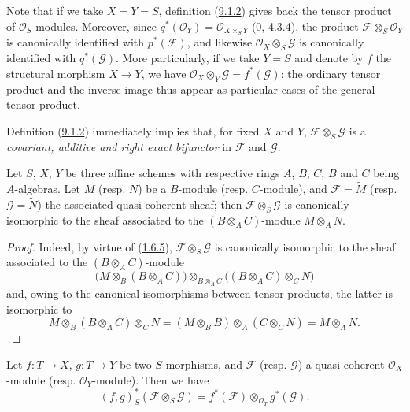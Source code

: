 Note that if we take $X=Y=S$, definition
(\hyperref[I.9.1.2]{9.1.2}) gives back the tensor product of
$\mathscr{O}_S$-modules. Moreover, since
$q^*(\mathscr{O}_Y)=\mathscr{O}_{X\times_S Y}$
(\hyperref[0.4.3.4]{0, 4.3.4}), the product
$\mathscr{F}\otimes_S\mathscr{O}_Y$ is canonically identified with
$p^*(\mathscr{F})$, and likewise
$\mathscr{O}_X\otimes_S\mathscr{G}$ is canonically identified with
$q^*(\mathscr{G})$. More particularly, if we take $Y=S$ and denote by $f$
the structural morphism $X\to Y$, we have
$\mathscr{O}_X\otimes_Y\mathscr{G}=f^*(\mathscr{G})$: the ordinary tensor
product and the inverse image thus appear as particular cases of the
general tensor product.

Definition (\hyperref[I.9.1.2]{9.1.2}) immediately implies that, for
fixed $X$ and $Y$, $\mathscr{F}\otimes_S\mathscr{G}$ is a
\emph{covariant, additive and right exact bifunctor} in $\mathscr{F}$ and
$\mathscr{G}$.

\begin{proposition}[9.1.3]
\label{I.9.1.3}
Let $S$, $X$, $Y$ be three affine schemes with respective rings $A$, $B$,
$C$, $B$ and $C$ being $A$-algebras. Let $M$ (resp. $N$) be a $B$-module
(resp. $C$-module), and $\mathscr{F}=\widetilde{M}$ (resp.
$\mathscr{G}=\widetilde{N}$) the associated quasi-coherent sheaf; then
$\mathscr{F}\otimes_S\mathscr{G}$ is canonically isomorphic to the sheaf
associated to the $(B\otimes_A C)$-module $M\otimes_A N$.
\end{proposition}

\begin{proof}
Indeed, by virtue of (\hyperref[I.1.6.5]{1.6.5}),
$\mathscr{F}\otimes_S\mathscr{G}$ is canonically isomorphic to the sheaf
associated to the $(B\otimes_A C)$-module
\[
  \bigl(M\otimes_B(B\otimes_A C)\bigr)
  \otimes_{B\otimes_A C}
  \bigl((B\otimes_A C)\otimes_C N\bigr)
\]
and, owing to the canonical isomorphisms between tensor products, the
latter is isomorphic to
\[
  M\otimes_B(B\otimes_A C)\otimes_C N
  =(M\otimes_B B)\otimes_A(C\otimes_C N)=M\otimes_A N.
\]
\end{proof}

\begin{proposition}[9.1.4]
\label{I.9.1.4}
Let $f:T\to X$, $g:T\to Y$ be two $S$-morphisms, and $\mathscr{F}$ (resp.
$\mathscr{G}$) a quasi-coherent $\mathscr{O}_X$-module (resp.
$\mathscr{O}_Y$-module). Then we have
\[
  (f,g)_S^*(\mathscr{F}\otimes_S\mathscr{G})
  =f^*(\mathscr{F})\otimes_{\mathscr{O}_T}g^*(\mathscr{G}).
\]
\end{proposition}

